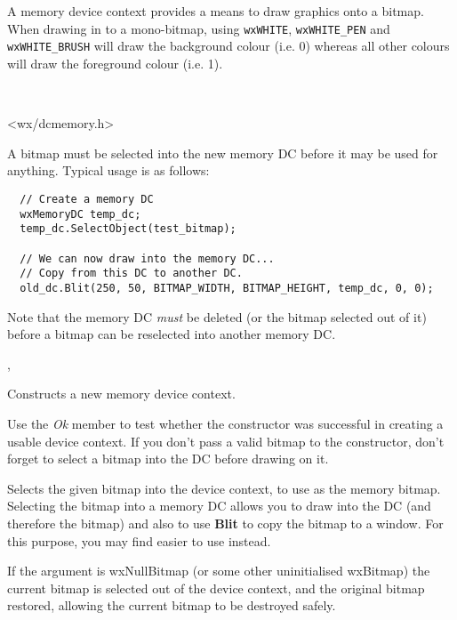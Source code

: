 \section{}\label{wxmemorydc}

A memory device context provides a means to draw graphics onto a bitmap. When
drawing in to a mono-bitmap, using {\tt wxWHITE}, {\tt wxWHITE\_PEN} and
{\tt wxWHITE\_BRUSH}
will draw the background colour (i.e. 0) whereas all other colours will draw the
foreground colour (i.e. 1).


\\


<wx/dcmemory.h>


A bitmap must be selected into the new memory DC before it may be used
for anything.  Typical usage is as follows:

\begin{verbatim}
  // Create a memory DC
  wxMemoryDC temp_dc;
  temp_dc.SelectObject(test_bitmap);

  // We can now draw into the memory DC...
  // Copy from this DC to another DC.
  old_dc.Blit(250, 50, BITMAP_WIDTH, BITMAP_HEIGHT, temp_dc, 0, 0);
\end{verbatim}

Note that the memory DC {\it must} be deleted (or the bitmap selected out of it) before a bitmap
can be reselected into another memory DC.


, 


\label{wxmemorydcctor}


Constructs a new memory device context.

Use the {\it Ok} member to test whether the constructor was successful
in creating a usable device context. If you don't pass a valid bitmap
to the constructor, don't forget to select a bitmap into the DC before
drawing on it.

\label{wxmemorydcselectobject}


Selects the given bitmap into the device context, to use as the memory
bitmap. Selecting the bitmap into a memory DC allows you to draw into
the DC (and therefore the bitmap) and also to use {\bf Blit} to copy
the bitmap to a window. For this purpose, you may find \rtfsp
easier to use instead.

If the argument is wxNullBitmap (or some other uninitialised wxBitmap) the current bitmap is selected out of the device
context, and the original bitmap restored, allowing the current bitmap to
be destroyed safely.

